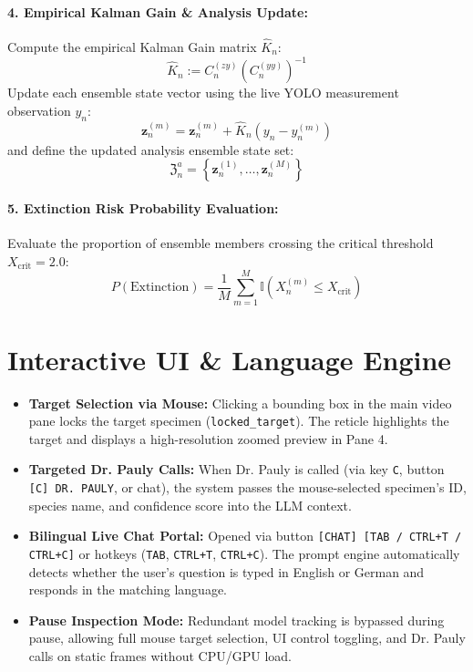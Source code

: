 \documentclass[11pt,a4paper]{article}
\begin{document}
\paragraph{4. Empirical Kalman Gain \& Analysis Update:}
Compute the empirical Kalman Gain matrix $\hat{K}_n$:
\begin{equation}
\hat{K}_n := C_n^{(zy)} \left(C_n^{(yy)}\right)^{-1}
\end{equation}
Update each ensemble state vector using the live YOLO measurement observation $y_n$:
\begin{equation}
\mathbf{z}_n^{(m)} = \mathbf{z}_n^{(m)} + \hat{K}_n \left(y_n - y_n^{(m)}\right)
\end{equation}
and define the updated analysis ensemble state set:
\begin{equation}
\mathfrak{Z}_n^a = \left\{ \mathbf{z}_n^{(1)}, \dots, \mathbf{z}_n^{(M)} \right\}
\end{equation}

\paragraph{5. Extinction Risk Probability Evaluation:}
Evaluate the proportion of ensemble members crossing the critical threshold $X_{\text{crit}} = 2.0$:
\begin{equation}
P(\text{Extinction}) = \frac{1}{M} \sum_{m=1}^M \mathbb{I}\left(X_n^{(m)} \le X_{\text{crit}}\right)
\end{equation}

\section{Interactive UI \& Language Engine}
\begin{itemize}
    \item \textbf{Target Selection via Mouse:} Clicking a bounding box in the main video pane locks the target specimen (\texttt{locked\_target}). The reticle highlights the target and displays a high-resolution zoomed preview in Pane 4.
    \item \textbf{Targeted Dr. Pauly Calls:} When Dr. Pauly is called (via key \texttt{C}, button \texttt{[C] DR. PAULY}, or chat), the system passes the mouse-selected specimen's ID, species name, and confidence score into the LLM context.
    \item \textbf{Bilingual Live Chat Portal:} Opened via button \texttt{[CHAT] [TAB / CTRL+T / CTRL+C]} or hotkeys (\texttt{TAB}, \texttt{CTRL+T}, \texttt{CTRL+C}). The prompt engine automatically detects whether the user's question is typed in English or German and responds in the matching language.
    \item \textbf{Pause Inspection Mode:} Redundant model tracking is bypassed during pause, allowing full mouse target selection, UI control toggling, and Dr. Pauly calls on static frames without CPU/GPU load.
\end{itemize}
\end{document}
